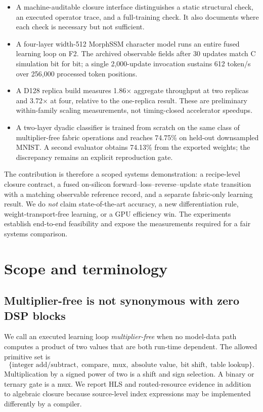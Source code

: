 \documentclass[10pt]{article}
\begin{document}
\begin{itemize}
  \item A machine-auditable closure interface distinguishes a static structural
  check, an executed operator trace, and a full-training check.  It also
  documents where each check is necessary but not sufficient.
  \item A four-layer width-512 MorphSSM character model runs an entire fused
  learning loop on F2.  The archived observable fields after 30 updates match
  C simulation bit for bit; a single 2,000-update invocation sustains 612
  token/s over 256,000 processed token positions.
  \item A D128 replica build measures 1.86$\times$ aggregate throughput at two
  replicas and 3.72$\times$ at four, relative to the one-replica result.  These
  are preliminary within-family scaling measurements, not timing-closed
  accelerator speedups.
  \item A two-layer dyadic classifier is trained from scratch on the same class
  of multiplier-free fabric operations and reaches 74.75\% on held-out
  downsampled MNIST.  A second evaluator obtains 74.13\% from the exported
  weights; the discrepancy remains an explicit reproduction gate.
\end{itemize}

The contribution is therefore a scoped systems demonstration: a recipe-level
closure contract, a fused on-silicon forward--loss--reverse--update state
transition with a matching observable reference record, and a separate
fabric-only learning result.  We do \emph{not} claim state-of-the-art accuracy,
a new differentiation rule, weight-transport-free learning, or a GPU
efficiency win.  The experiments establish end-to-end feasibility and expose
the measurements required for a fair systems comparison.

\section{Scope and terminology}

\subsection{Multiplier-free is not synonymous with zero DSP blocks}

We call an executed learning loop \emph{multiplier-free} when no model-data
path computes a product of two values that are both run-time dependent.  The
allowed primitive set is
\[
  \{\text{integer add/subtract},\; \text{compare},\; \text{mux},\;
    \text{absolute value},\; \text{bit shift},\; \text{table lookup}\}.
\]
Multiplication by a signed power of two is a shift and sign selection.  A
binary or ternary gate is a mux.  We report HLS and routed-resource evidence in
addition to algebraic closure because source-level index expressions may be
implemented differently by a compiler.
\end{document}
